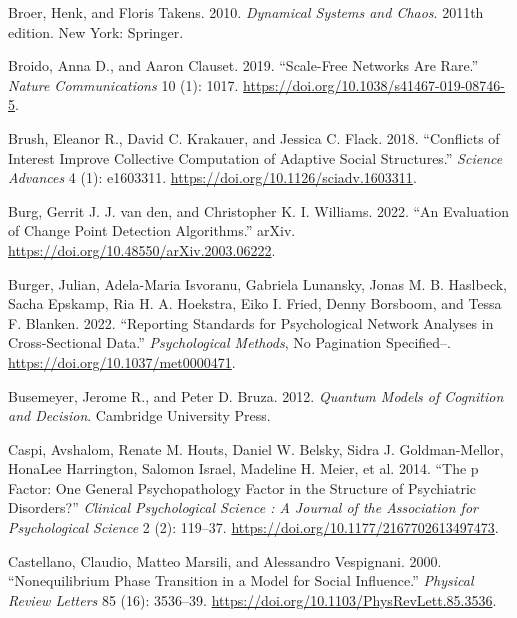 \documentclass[
  a4paper,
  DIV=11,
  numbers=noendperiod]{scrreprt}
\newlength{\cslhangindent}
\newlength{\cslentryspacingunit} %
\newenvironment{CSLReferences}[2] %
 {%
  \setlength{\parindent}{0pt}
  \ifodd #1
  \let\oldpar\par
  \def\par{\hangindent=\cslhangindent\oldpar}
  \fi
  \setlength{\parskip}{#2\cslentryspacingunit}
 }%
 {}
\begin{document}
\begin{CSLReferences}{1}{0}
\leavevmode{}%
Broer, Henk, and Floris Takens. 2010. \emph{Dynamical Systems and
Chaos}. 2011th edition. New York: Springer.

\leavevmode{}%
Broido, Anna D., and Aaron Clauset. 2019. {``Scale-Free Networks Are
Rare.''} \emph{Nature Communications} 10 (1): 1017.
\url{https://doi.org/10.1038/s41467-019-08746-5}.

\leavevmode{}%
Brush, Eleanor R., David C. Krakauer, and Jessica C. Flack. 2018.
{``Conflicts of Interest Improve Collective Computation of Adaptive
Social Structures.''} \emph{Science Advances} 4 (1): e1603311.
\url{https://doi.org/10.1126/sciadv.1603311}.

\leavevmode{}%
Burg, Gerrit J. J. van den, and Christopher K. I. Williams. 2022. {``An
{Evaluation} of {Change Point Detection Algorithms}.''} {arXiv}.
\url{https://doi.org/10.48550/arXiv.2003.06222}.

\leavevmode{}%
Burger, Julian, Adela-Maria Isvoranu, Gabriela Lunansky, Jonas M. B.
Haslbeck, Sacha Epskamp, Ria H. A. Hoekstra, Eiko I. Fried, Denny
Borsboom, and Tessa F. Blanken. 2022. {``Reporting Standards for
Psychological Network Analyses in Cross-Sectional Data.''}
\emph{Psychological Methods}, No Pagination Specified--.
\url{https://doi.org/10.1037/met0000471}.

\leavevmode{}%
Busemeyer, Jerome R., and Peter D. Bruza. 2012. \emph{Quantum {Models}
of {Cognition} and {Decision}}. {Cambridge University Press}.

\leavevmode{}%
Caspi, Avshalom, Renate M. Houts, Daniel W. Belsky, Sidra J.
Goldman-Mellor, HonaLee Harrington, Salomon Israel, Madeline H. Meier,
et al. 2014. {``The p {Factor}: {One General Psychopathology Factor} in
the {Structure} of {Psychiatric Disorders}?''} \emph{Clinical
Psychological Science : A Journal of the Association for Psychological
Science} 2 (2): 119--37. \url{https://doi.org/10.1177/2167702613497473}.

\leavevmode{}%
Castellano, Claudio, Matteo Marsili, and Alessandro Vespignani. 2000.
{``Nonequilibrium {Phase Transition} in a {Model} for {Social
Influence}.''} \emph{Physical Review Letters} 85 (16): 3536--39.
\url{https://doi.org/10.1103/PhysRevLett.85.3536}.


\end{CSLReferences}
\end{document}
